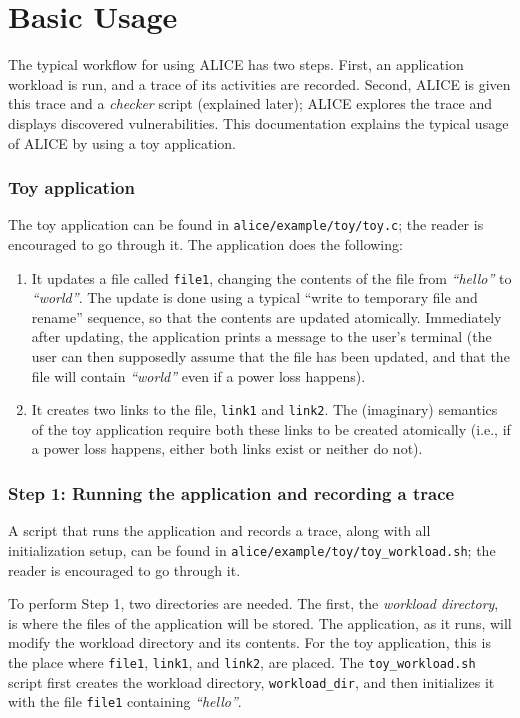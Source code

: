 \documentclass[oneside]{memoir}
\begin{document}
\chapter{Basic Usage}
The typical workflow for using ALICE has two steps. First, an application workload is run, and a trace of its activities are recorded. Second, ALICE is given this trace and a \textit{checker} script (explained later); ALICE explores the trace and displays discovered vulnerabilities. This documentation explains the typical usage of ALICE by using a toy application.

\subsection{Toy application}
The toy application can be found in \verb;alice/example/toy/toy.c;; the reader is encouraged to go through it. The application does the following:
\begin{enumerate}
\item It updates a file called \verb;file1;, changing the contents of the file from \textit{``hello''} to \textit{``world''}. The update is done using a typical ``write to temporary file and rename'' sequence, so that the contents are updated atomically. Immediately after updating, the application prints a message to the user's terminal (the user can then supposedly assume that the file has been updated, and that the file will contain \textit{``world''} even if a power loss happens).
\item It creates two links to the file, \verb;link1; and \verb;link2;. The (imaginary) semantics of the toy application require both these links to be created atomically (i.e., if a power loss happens, either both links exist or neither do not).
\end{enumerate}

\subsection{Step 1: Running the application and recording a trace}
A script that runs the application and records a trace, along with all initialization setup, can be found in \verb;alice/example/toy/toy_workload.sh;; the reader is encouraged to go through it. 

To perform \textmd{Step 1}, two directories are needed. The first, the \textit{workload directory}, is where the files of the application will be stored. The application, as it runs, will modify the workload directory and its contents. For the toy application, this is the place where \verb;file1;, \verb;link1;, and \verb;link2;, are placed. The \verb;toy_workload.sh; script first creates the workload directory, \verb;workload_dir;, and then initializes it with the file \verb;file1; containing \textit{``hello''}.
\end{document}
